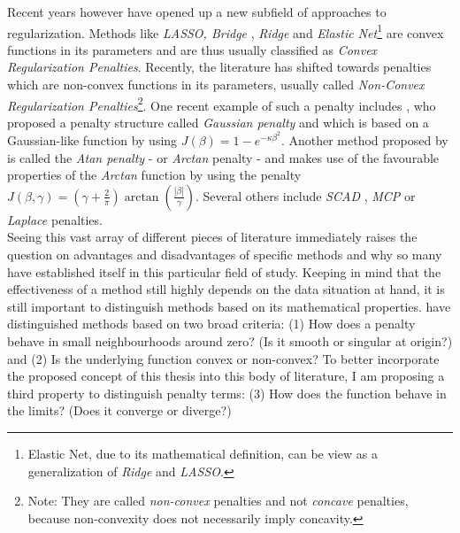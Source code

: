 \documentclass[12pt,a4paper]{article}
\begin{document}
Recent years however have opened up a new subfield of approaches to regularization. Methods like \textit{LASSO, Bridge} \parencite{FrankFriedman1993}, \textit{Ridge} and \textit{Elastic Net}\footnote{Elastic Net, due to its mathematical definition, can be view as a generalization of \textit{Ridge} and \textit{LASSO}.} are convex functions in its parameters and are thus usually classified as \textit{Convex Regularization Penalties}. Recently, the literature has shifted towards penalties which are non-convex functions in its parameters, usually called \textit{Non-Convex Regularization Penalties}\footnote{Note: They are called \textit{non-convex} penalties and not \textit{concave} penalties, because non-convexity does not necessarily imply concavity.}. One recent example of such a penalty includes \textcite{JohnVettamWu2022}, who proposed a penalty structure called \textit{Gaussian penalty} and which is based on a Gaussian-like function by using $J(\beta) = 1 - e^{-\kappa\beta^2}$. Another method proposed by \textcite{WangZhu2016} is called the \textit{Atan penalty} - or \textit{Arctan} penalty - and makes use of the favourable properties of the \textit{Arctan} function by using the penalty $J(\beta, \gamma) = (\gamma + \frac{2}{\pi})\arctan(\frac{|\beta|}{\gamma})$. Several others include \textit{SCAD} \parencite{FanLi2001}, \textit{MCP} \parencite{Zhang2010} or \textit{Laplace} \parencite{TrzaskoManduca2009} penalties.\\

Seeing this vast array of different pieces of literature immediately raises the question on advantages and disadvantages of specific methods and why so many have established itself in this particular field of study. Keeping in mind that the effectiveness of a method still highly depends on the data situation at hand, it is still important to distinguish methods based on its mathematical properties. \textcite{JohnVettamWu2022} have distinguished methods based on two broad criteria: (1) How does a penalty behave in small neighbourhoods around zero? (Is it smooth or singular at origin?) and (2) Is the underlying function convex or non-convex? To better incorporate the proposed concept of this thesis into this body of literature, I am proposing a third property to distinguish penalty terms: (3) How does the function behave in the limits? (Does it converge or diverge?) \\
\end{document}
